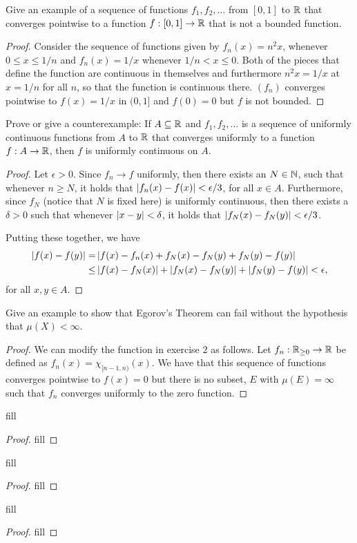 \begin{exercise}{3}
Give an example of a sequence of functions $f_1, f_2, \dots$ from $[0,1]$ to $\mathbb{R}$ that converges pointwise to a function $f:[0,1] \to \mathbb{R}$ that is not a bounded function.
\end{exercise}
\begin{proof}
Consider the sequence of functions given by $f_n(x) = n^2 x$, whenever $0 \leq x \leq 1/n$ and $f_n(x) = 1/x$ whenever $1/n < x \leq 0$.
Both of the pieces that define the function are continuous in themselves and furthermore $n^2 x= 1/x$ at $x=1/n$ for all $n$, so that the function is continuous there. 
$(f_n)$ converges pointwise to $f(x) = 1/x$ in $(0,1]$ and $f(0) = 0$ but $f$ is not bounded.
\end{proof} 

\begin{exercise}{4}
Prove or give a counterexample:
If $A \subseteq \mathbb{R}$ and $f_1,f_2,\dots$ is a sequence of uniformly continuous functions from $A$ to $\mathbb{R}$ that converges uniformly to a function $f: A \to \mathbb{R}$, then $f$ is uniformly continuous on $A$.
\end{exercise}
\begin{proof}
Let $\epsilon > 0$.
Since $f_n \to f$ uniformly, then there exists an $N \in \mathbb{N}$, such that whenever $n \geq N$, it holds that $\left\lvert f_n(x) - f(x)\right\rvert < \epsilon/3$, for all $x \in A$.
Furthermore, since $f_N$ (notice that $N$ is fixed here) is uniformly continuous, then there exists a $\delta > 0$ such that whenever $\left\lvert x - y\right\rvert < \delta$, it holds that $\left\lvert f_N(x) - f_N(y)\right\rvert < \epsilon/3$.

Putting these together, we have
\begin{align*}
    \left\lvert f(x) - f(y)\right\rvert
    =& \left\lvert f(x) - f_n(x) + f_N(x) - f_N(y) + f_N(y) -f(y)\right\rvert\\
    \leq& \left\lvert f(x) - f_N(x)\right\rvert 
    + \left\lvert f_N(x) - f_N(y)\right\rvert
    + \left\lvert f_N(y) -f(y)\right\rvert < \epsilon,
\end{align*}
for all $x,y \in A$.
\end{proof} 

\begin{exercise}{5}
Give an example to show that Egorov's Theorem can fail without the hypothesis that $\mu(X) < \infty$.
\end{exercise}
\begin{proof}
We can modify the function in exercise 2 as follows.
Let $f_n : \mathbb{R}_{\geq 0} \to \mathbb{R}$ be defined as $f_n(x) = \chi_{[n-1,n)}(x)$.
We have that this sequence of functions converges pointwise to $f(x) = 0$ but there is no subset, $E$ with $\mu(E) = \infty$ such that $f_n$ converges uniformly to the zero function.
\end{proof} 

\begin{exercise}{7}
fill
\end{exercise}
\begin{proof}
fill
\end{proof} 

\begin{exercise}{13}
fill
\end{exercise}
\begin{proof}
fill
\end{proof} 

\begin{exercise}{15}
fill
\end{exercise}
\begin{proof}
fill
\end{proof} 
